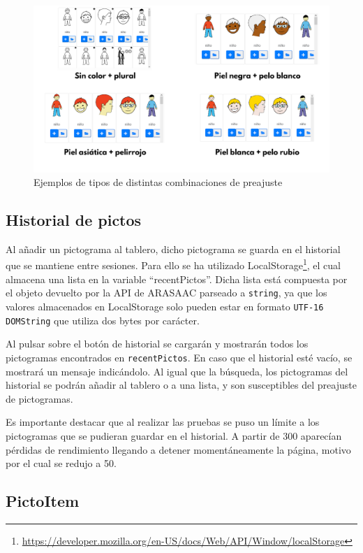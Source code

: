 \begin{figure}[h!]
	\centering
	\includegraphics[width=0.9\linewidth]{Imagenes/Bitmap/buscarPictoPreajuste}
	\caption{Ejemplos de tipos de distintas combinaciones de preajuste}
	\label{fig:buscarpictopreajuste}
\end{figure}



\subsection{Historial de pictos}

Al añadir un pictograma al tablero, dicho pictograma se guarda en el historial que se mantiene entre sesiones. Para ello se ha utilizado LocalStorage\footnote{\url{https://developer.mozilla.org/en-US/docs/Web/API/Window/localStorage}}, el cual almacena una lista en la variable “recentPictos”. Dicha lista está compuesta por el objeto devuelto por la API de ARASAAC parseado a \texttt{string}, ya que los valores almacenados en LocalStorage solo pueden estar en formato \texttt{UTF-16 DOMString} que utiliza dos bytes por carácter.

Al pulsar sobre el botón de historial se cargarán y mostrarán todos los pictogramas encontrados en \texttt{recentPictos}. En caso que el historial esté vacío, se mostrará un mensaje indicándolo. Al igual que la búsqueda, los pictogramas del historial se podrán añadir al tablero o a una lista, y son susceptibles del preajuste de pictogramas.

Es importante destacar que al realizar las pruebas se puso un límite a los pictogramas que se pudieran guardar en el historial. A partir de 300 aparecían pérdidas de rendimiento llegando a detener momentáneamente la página, motivo por el cual se redujo a 50.

\subsection{PictoItem}

